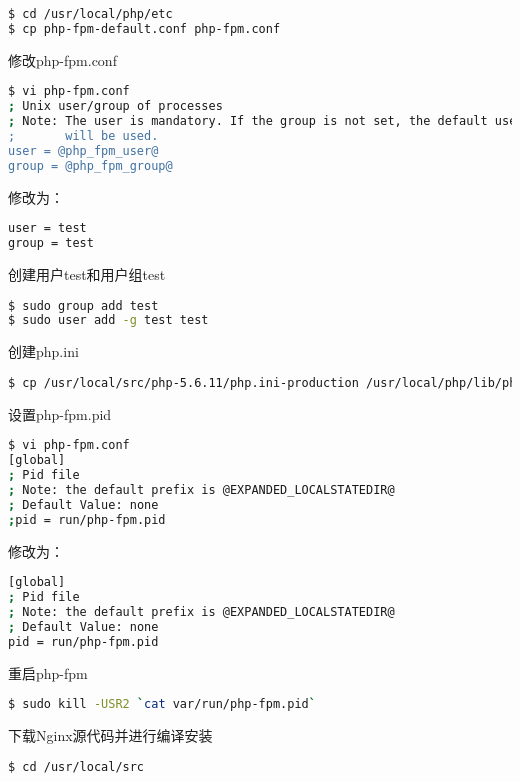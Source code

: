 \begin{lstlisting}[language=bash]
$ cd /usr/local/php/etc
$ cp php-fpm-default.conf php-fpm.conf
\end{lstlisting}

修改php-fpm.conf


\begin{lstlisting}[language=bash]
$ vi php-fpm.conf
; Unix user/group of processes
; Note: The user is mandatory. If the group is not set, the default user's group
;       will be used.
user = @php_fpm_user@
group = @php_fpm_group@
\end{lstlisting}

修改为：


\begin{lstlisting}[language=bash]
user = test
group = test
\end{lstlisting}

创建用户test和用户组test


\begin{lstlisting}[language=bash]
$ sudo group add test
$ sudo user add -g test test
\end{lstlisting}

创建php.ini

\begin{lstlisting}[language=bash]
$ cp /usr/local/src/php-5.6.11/php.ini-production /usr/local/php/lib/php.ini
\end{lstlisting}

设置php-fpm.pid

\begin{lstlisting}[language=bash]
$ vi php-fpm.conf
[global]
; Pid file
; Note: the default prefix is @EXPANDED_LOCALSTATEDIR@
; Default Value: none
;pid = run/php-fpm.pid
\end{lstlisting}

修改为：

\begin{lstlisting}[language=bash]
[global]
; Pid file
; Note: the default prefix is @EXPANDED_LOCALSTATEDIR@
; Default Value: none
pid = run/php-fpm.pid
\end{lstlisting}

重启php-fpm


\begin{lstlisting}[language=bash]
$ sudo kill -USR2 `cat var/run/php-fpm.pid`
\end{lstlisting}

下载Nginx源代码并进行编译安装


\begin{lstlisting}[language=bash]
$ cd /usr/local/src
\end{lstlisting}


